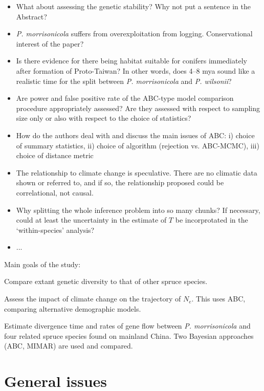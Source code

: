 \documentclass[11pt]{article}
\newenvironment{my_enumerate}
{\begin{enumerate}
  \setlength{\itemsep}{2pt}
  \setlength{\parskip}{0pt}
  \setlength{\parsep}{0pt}}
{\end{enumerate}}
\begin{document}
\begin{itemize}
	\item What about assessing the genetic stability? Why not put a sentence in the Abstract?
	\item \emph{P. morrisonicola} suffers from overexploitation from logging. Conservational interest of the paper?
	\item Is there evidence for there being habitat suitable for conifers immediately after formation of Proto-Taiwan? In other words, does 4--8 mya sound like a realistic time for the split between \emph{P. morrisonicola} and \emph{P. wilsonii}?
	\item Are power and false positive rate of the ABC-type model comparison procedure appropriately assessed? Are they assessed with respect to sampling size only or also with respect to the choice of statistics?
	\item How do the authors deal with and discuss the main issues of ABC: i) choice of summary statistics, ii) choice of algorithm (rejection vs. ABC-MCMC), iii) choice of distance metric
	\item The relationship to climate change is speculative. There are no climatic data shown or referred to, and if so, the relationship proposed could be correlational, not causal.
	\item Why splitting the whole inference problem into so many chunks? If necessary, could at least the uncertainty in the estimate of $T$ be incorprotated in the `within-species' analysis?
	\item ...
	\end{itemize}

Main goals of the study:
\begin{my_enumerate}
	\item Compare extant genetic diversity to that of other spruce species.
	\item Assess the impact of climate change on the trajectory of $N_e$. This uses ABC, comparing alternative demographic models.
	\item Estimate divergence time and rates of gene flow between \emph{P. morrisonicola} and four related spruce species found on mainland China. Two Bayesian approaches (ABC, MIMAR) are used and compared.
\end{my_enumerate}


\section{General issues}
\end{document}
